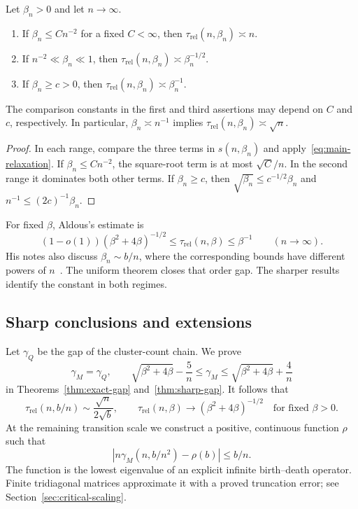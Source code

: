 \begin{samepage}
\begin{corollary}\label{cor:regimes}
Let $\beta_n>0$ and let $n\to\infty$.
\begin{enumerate}
 \item If $\beta_n\le Cn^{-2}$ for a fixed $C<\infty$, then
       $\tau_{\mathrm{rel}}(n,\beta_n)\asymp n$.
 \item If $n^{-2}\ll\beta_n\ll1$, then
       $\tau_{\mathrm{rel}}(n,\beta_n)\asymp\beta_n^{-1/2}$.
 \item If $\beta_n\ge c>0$, then
       $\tau_{\mathrm{rel}}(n,\beta_n)\asymp\beta_n^{-1}$.
\end{enumerate}
The comparison constants in the first and third assertions may depend on $C$ and $c$, respectively. In particular, $\beta_n\asymp n^{-1}$ implies
$\tau_{\mathrm{rel}}(n,\beta_n)\asymp\sqrt n$.
\end{corollary}
\end{samepage}

\begin{proof}
In each range, compare the three terms in $s(n,\beta_n)$ and apply~\eqref{eq:main-relaxation}. If $\beta_n\le Cn^{-2}$, the square-root term is at most $\sqrt C/n$. In the second range it dominates both other terms. If $\beta_n\ge c$, then $\sqrt{\beta_n}\le c^{-1/2}\beta_n$ and $n^{-1}\le(2c)^{-1}\beta_n$.
\end{proof}

For fixed $\beta$, Aldous's estimate is
\begin{equation}\label{eq:aldous-bound}
 (1-o(1))(\beta^2+4\beta)^{-1/2}
 \le\tau_{\mathrm{rel}}(n,\beta)\le\beta^{-1}
 \qquad(n\to\infty).
\end{equation}
His notes also discuss $\beta_n\sim b/n$, where the corresponding bounds
have different powers of $n$~\cite{AldousNotes}. The uniform theorem
closes that order gap. The sharper results identify the constant in
both regimes.

\subsection{Sharp conclusions and extensions}

Let $\gamma_Q$ be the gap of the cluster-count chain. We prove
\[
 \gamma_M=\gamma_Q,\qquad
 \sqrt{\beta^2+4\beta}-\frac5n
 \le\gamma_M\le
 \sqrt{\beta^2+4\beta}+\frac4n
\]
in Theorems~\ref{thm:exact-gap} and~\ref{thm:sharp-gap}.
It follows that
\[
 \tau_{\mathrm{rel}}(n,b/n)\sim\frac{\sqrt n}{2\sqrt b},
 \qquad
 \tau_{\mathrm{rel}}(n,\beta)\longrightarrow
       (\beta^2+4\beta)^{-1/2}
 \quad\text{for fixed }\beta>0.
\]
At the remaining transition scale we construct a positive, continuous
function $\rho$ such that
\[
 \left|n\gamma_M(n,b/n^2)-\rho(b)\right|\le b/n.
\]
The function is the lowest eigenvalue of an explicit infinite
birth--death operator. Finite tridiagonal matrices approximate it with
a proved truncation error; see Section~\ref{sec:critical-scaling}.


